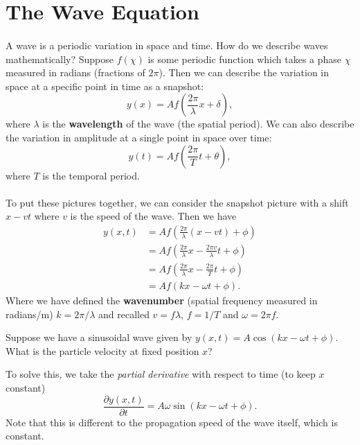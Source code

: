 \documentclass[../newtonian_mechanics.tex]{subfiles}
\begin{document}
    \section{The Wave Equation}
        \paragraph{}
        A wave is a periodic variation in space and time.
        How do we describe waves mathematically?
        Suppose $f(\chi)$ is some periodic function which takes a phase $\chi$ measured in radians (fractions of $2\pi$).
        Then we can describe the variation in space at a specific point in time as a snapshot:
        \begin{equation}
            y(x) = A f\left(\frac{2\pi}{\lambda}x+\delta\right),
        \end{equation}
        where $\lambda$ is the \textbf{wavelength} of the wave (the spatial period).
        We can also describe the variation in amplitude at a single point in space over time:
        \begin{equation}
            y(t)=A f\left(\frac{2\pi}{T}t+\theta\right),
        \end{equation}
        where $T$ is the temporal period.

        \paragraph{}
        To put these pictures together, we can consider the snapshot picture with a shift $x-vt$ where $v$ is the speed of the wave.
        Then we have
        \begin{align}
            y(x, t) &= A f\left(\frac{2\pi}{\lambda}(x-vt) + \phi\right)\\
            &= A f\left(\frac{2\pi}{\lambda}x - \frac{2\pi v}{\lambda}t + \phi\right)\\
            &= A f\left(\frac{2\pi}{\lambda}x - \frac{2\pi}{T}t + \phi\right)\\
            &= A f(kx - \omega t + \phi).
        \end{align} 
        Where we have defined the \textbf{wavenumber} (spatial frequency measured in radians/m) $k=2\pi/\lambda$ and recalled $v=f\lambda$, $f=1/T$ and $\omega=2\pi f$.
        \begin{example}
            Suppose we have a sinusoidal wave given by $y(x, t)=A\cos(kx-\omega t+\phi)$.
            What is the particle velocity at fixed position $x$?

            To solve this, we take the \textit{partial derivative} with respect to time (to keep $x$ constant)
            \begin{equation}
                \frac{\partial y(x, t)}{\partial t}=A\omega\sin(kx-\omega t+\phi).
            \end{equation}
            Note that this is different to the propagation speed of the wave itself, which is constant.
        \end{example}
\end{document}
